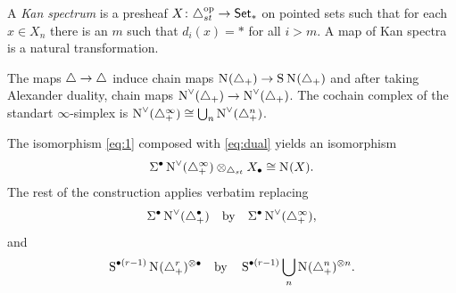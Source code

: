 \begin{definition}
	A \emph{Kan spectrum} is a presheaf $X \colon \triangle_{st}^{{\mathrm{op}}} \to \mathsf{Set}_*$ on pointed sets such that for each $x\in X_n$ there is an $m$ such that $d_i(x) = *$ for all $i>m$. A map of Kan spectra is a natural transformation.
\end{definition}

The maps $\triangle\to \triangle$ induce chain maps $\operatorname{N}_{}(\triangle_{+})\to \operatorname{S}^{}\operatorname{N}_{}(\triangle_{+})$ and after taking Alexander duality, chain maps $\operatorname{N}^\vee_{}(\triangle_{+})\to \operatorname{N}^\vee_{}(\triangle_{+})$. The cochain complex of the standart $\infty$-simplex is $\operatorname{N}^\vee_{}(\triangle_{+}^\infty)\cong \bigcup_n \operatorname{N}^\vee_{}(\triangle_{+}^n)$.


The isomorphism \eqref{eq:1} composed with \eqref{eq:dual} yields an isomorphism
\[
		\Sigma^{\bullet}\operatorname{N}^\vee_{}(\triangle_{+}^{\infty}) \otimes_{\triangle_{st}} X_\bullet \cong \operatorname{N}_{}(X).	
\]
The rest of the construction applies verbatim replacing
\[
\Sigma^{\bullet}\operatorname{N}^\vee_{}(\triangle_{+}^{\bullet})
\quad \text{by}
\quad  \Sigma^{\bullet}\operatorname{N}^\vee_{}(\triangle_{+}^{\infty})
,\] 
and
\[
\operatorname{S}^{\bullet(r-1)}\operatorname{N}_{}(\triangle_{+}^r)^{\otimes \bullet}
\quad \text{by} \quad
\operatorname{S}^{\bullet(r-1)}\bigcup_n\operatorname{N}_{}(\triangle_{+}^n)^{\otimes n}.
\]
%
%
%
%
%
%
%

